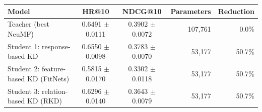 \begin{tabular}{lccrr}
\toprule
Model & HR@10 & NDCG@10 & Parameters & Reduction \\
\midrule
Teacher (best NeuMF) & 0.6491 $\pm$ 0.0111 & 0.3902 $\pm$ 0.0072 & 107,761 & 0.0\% \\
Student 1: response-based KD & 0.6550 $\pm$ 0.0098 & 0.3783 $\pm$ 0.0070 & 53,177 & 50.7\% \\
Student 2: feature-based KD (FitNets) & 0.5815 $\pm$ 0.0170 & 0.3302 $\pm$ 0.0118 & 53,177 & 50.7\% \\
Student 3: relation-based KD (RKD) & 0.6296 $\pm$ 0.0140 & 0.3643 $\pm$ 0.0079 & 53,177 & 50.7\% \\
\bottomrule
\end{tabular}
